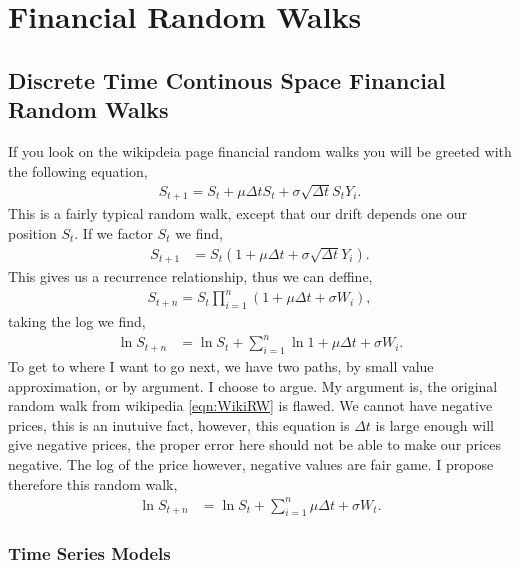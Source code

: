 \chapter{Financial Random Walks}
\label{chap: 2 financial random walks}

\section{Discrete Time Continous Space Financial Random Walks}

If you look on the wikipdeia page financial random walks you will be greeted with the following equation,
\begin{align}
    S_{t+1} = S_t + \mu \Delta t S_t + \sigma \sqrt{\Delta t} S_t Y_i. \label{eqn:WikiRW}
\end{align}
This is a fairly typical random walk, except that our drift depends one our position $S_t$. If we factor $S_t$ we find,
\begin{align*}
    S_{t+1} &= S_t\left(1 + \mu \Delta t + \sigma \sqrt{\Delta t} Y_i\right).
\end{align*}
This gives us a recurrence relationship, thus we can deffine,
\begin{align*}
    S_{t+n} = S_t\prod_{i=1}^{n}\left(1 + \mu \Delta t + \sigma  W_{i}\right),
\end{align*}
taking the log we find,
\begin{align*}
    \ln{S_{t+n}} &= \ln{S_t} + \sum_{i=1}^{n} \ln{1 + \mu \Delta t + \sigma W_i}.
\end{align*}
To get to where I want to go next, we have two paths, by small value approximation, or by argument. I choose to argue. My argument is, the original random walk from wikipedia \eqref{eqn:WikiRW} is flawed. We cannot have negative prices, this is an inutuive fact, however, this equation is $\Delta t$ is large enough will give negative prices, the proper error here should not be able to make our prices negative. The log of the price however, negative values are fair game. I propose therefore this random walk,
\begin{align}
    \ln{S_{t+n}} &= \ln{S_t} + \sum_{i=1}^{n} \mu \Delta t + \sigma W_t. \label{eqn:LogRW}
\end{align}

\subsection{Time Series Models}




